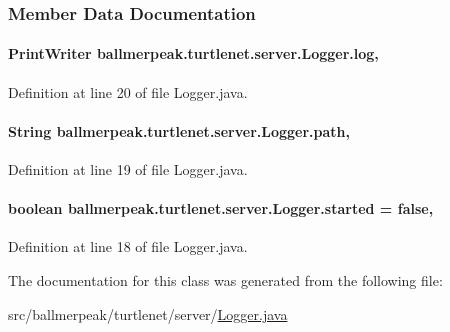\subsubsection{Member Data Documentation}
\hypertarget{classballmerpeak_1_1turtlenet_1_1server_1_1Logger_a136d9200b2f7cc5b5fa6820a94e638f3}{
\paragraph[{log}]{\setlength{\rightskip}{0pt plus 5cm}Print\-Writer ballmerpeak.\-turtlenet.\-server.\-Logger.\-log\hspace{0.3cm}{\ttfamily [static]}, {\ttfamily [package]}}}\label{classballmerpeak_1_1turtlenet_1_1server_1_1Logger_a136d9200b2f7cc5b5fa6820a94e638f3}


Definition at line 20 of file Logger.\-java.

\hypertarget{classballmerpeak_1_1turtlenet_1_1server_1_1Logger_a708f083875f540ac0ef58e21eb4b0f9c}{
\paragraph[{path}]{\setlength{\rightskip}{0pt plus 5cm}String ballmerpeak.\-turtlenet.\-server.\-Logger.\-path\hspace{0.3cm}{\ttfamily [static]}, {\ttfamily [package]}}}\label{classballmerpeak_1_1turtlenet_1_1server_1_1Logger_a708f083875f540ac0ef58e21eb4b0f9c}


Definition at line 19 of file Logger.\-java.

\hypertarget{classballmerpeak_1_1turtlenet_1_1server_1_1Logger_acd0e511fcc5838a9fac44ea93121b196}{
\paragraph[{started}]{\setlength{\rightskip}{0pt plus 5cm}boolean ballmerpeak.\-turtlenet.\-server.\-Logger.\-started = false\hspace{0.3cm}{\ttfamily [static]}, {\ttfamily [package]}}}\label{classballmerpeak_1_1turtlenet_1_1server_1_1Logger_acd0e511fcc5838a9fac44ea93121b196}


Definition at line 18 of file Logger.\-java.



The documentation for this class was generated from the following file\-:\begin{DoxyCompactItemize}
\item 
src/ballmerpeak/turtlenet/server/\hyperlink{Logger_8java}{Logger.\-java}\end{DoxyCompactItemize}
